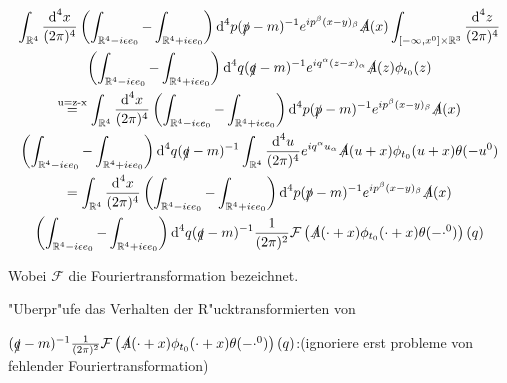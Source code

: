 \documentclass[a4paper,12pt]{article}
\newcommand{\equaltext}[1]{\ensuremath{\stackrel{\text{#1}}{=}}}
\begin{document}
\begin{multline}
\int_{\mathbb{R}^4} \frac{\text{d}^4x}{(2\pi)^4} \left( \int_{\mathbb{R}^4-i \epsilon e_0}-\int_{\mathbb{R}^4+i \epsilon e_0} \right)\text{d}^4p (\slashed{p}-m)^{-1} e^{ip^\beta(x-y)_\beta}   \slashed{A}(x) \int_{[-\infty,x^0]\times \mathbb{R}^3}\frac{\text{d}^4z}{(2\pi)^4} \\ \left( \int_{\mathbb{R}^4-i \epsilon e_0}-\int_{\mathbb{R}^4+i \epsilon e_0} \right)\text{d}^4q (\slashed{q}-m)^{-1} e^{iq^\alpha(z-x)_\alpha}   \slashed{A}(z)\phi_{t_0}(z)\\
\equaltext{u=z-x}\int_{\mathbb{R}^4} \frac{\text{d}^4x}{(2\pi)^4} \left( \int_{\mathbb{R}^4-i \epsilon e_0}-\int_{\mathbb{R}^4+i \epsilon e_0} \right)\text{d}^4p (\slashed{p}-m)^{-1} e^{ip^\beta(x-y)_\beta}   \slashed{A}(x)  \\ \left( \int_{\mathbb{R}^4-i \epsilon e_0}-\int_{\mathbb{R}^4+i \epsilon e_0} \right)\text{d}^4q (\slashed{q}-m)^{-1} \int_{\mathbb{R}^4}\frac{\text{d}^4u}{(2\pi)^4}e^{iq^\alpha u_\alpha}   \slashed{A}(u+x)\phi_{t_0}(u+x)\theta(-u^0)\\
=\int_{\mathbb{R}^4} \frac{\text{d}^4x}{(2\pi)^4} \left( \int_{\mathbb{R}^4-i \epsilon e_0}-\int_{\mathbb{R}^4+i \epsilon e_0} \right)\text{d}^4p (\slashed{p}-m)^{-1} e^{ip^\beta(x-y)_\beta}   \slashed{A}(x)  \\ \left( \int_{\mathbb{R}^4-i \epsilon e_0}-\int_{\mathbb{R}^4+i \epsilon e_0} \right)\text{d}^4q (\slashed{q}-m)^{-1} \frac{1}{(2\pi)^2} \mathcal{F}\left( \slashed{A}(\cdot+x)\phi_{t_0}(\cdot+x)\theta(-\cdot^0)\right)(q)\\
\end{multline}

Wobei \(\mathcal{F}\) die Fouriertransformation bezeichnet. 

"Uberpr"ufe das Verhalten der R"ucktransformierten von 

\((\slashed{q}-m)^{-1} \frac{1}{(2\pi)^2} \mathcal{F}\left( \slashed{A}(\cdot+x)\phi_{t_0}(\cdot+x)\theta(-\cdot^0)\right)(q)\):(ignoriere erst probleme von fehlender Fouriertransformation)
\end{document}
